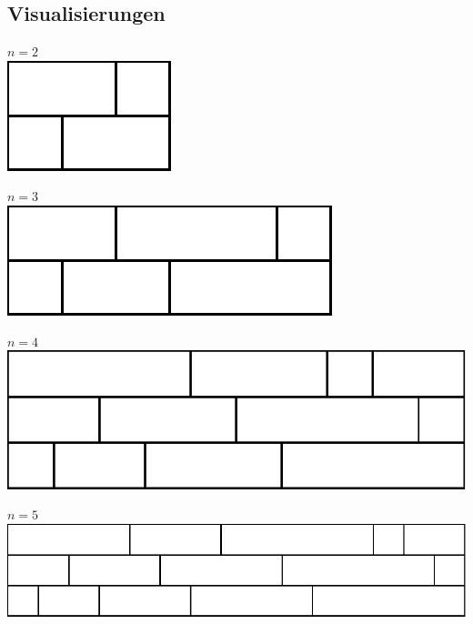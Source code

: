 \documentclass[a4paper, notitlepage, 12pt]{scrartcl}
\begin{document}
\subsection*{Visualisierungen}
\begin{center}
$n = 2$\\
\includegraphics[scale=.5]{../Bwinf-Aufgabe1-KunstDerFuge/visualisierung/mauer-2.pdf}
\par\vspace{1em}
$n = 3$\\
\includegraphics[scale=.5]{../Bwinf-Aufgabe1-KunstDerFuge/visualisierung/mauer-3.pdf}
\par\vspace{1em}
$n = 4$\\
\includegraphics[scale=.5]{../Bwinf-Aufgabe1-KunstDerFuge/visualisierung/mauer-4.pdf}
\par\vspace{1em}
$n = 5$\\
\includegraphics[scale=.5]{../Bwinf-Aufgabe1-KunstDerFuge/visualisierung/mauer-5.pdf}
\par\vspace{1em}

\end{center}
\end{document}
